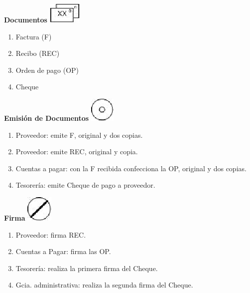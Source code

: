 \begin{center}
  \textbf{Documentos}
  \includegraphics{./Images/Simbolos/simbolo-Documentos.png}
\end{center}
\begin{enumerate}
  \item Factura (F)
  \item Recibo (REC)
  \item Orden de pago (OP)
  \item Cheque
\end{enumerate}

\begin{center}
  \textbf{Emisión de Documentos}
  \includegraphics{./Images/Simbolos/simbolo-Emision-de-Documentos.png}
\end{center}
\begin{enumerate}
  \item Proveedor: emite F, original y dos copias.
  \item Proveedor: emite REC, original y copia.
  \item Cuentas a pagar: con la F recibida confecciona la OP, original y dos copias.
  \item Tesorería: emite Cheque de pago a proveedor.
\end{enumerate}

\begin{center}
  \textbf{Firma}
  \includegraphics{./Images/Simbolos/simbolo-Firma.png}
\end{center}
\begin{enumerate}
  \item Proveedor: firma REC.
  \item Cuentas a Pagar: firma las OP.
  \item Tesorería: realiza la primera firma del Cheque.
  \item Gcia. administrativa: realiza la segunda firma del Cheque.
\end{enumerate}

